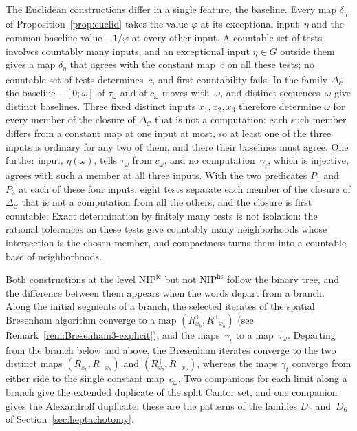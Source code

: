 \documentclass[psamsfonts]{amsart}
\theoremstyle{definition}
\theoremstyle{remark}
\newcommand{\NIP}{\text{NIP}}
\numberwithin{equation}{section}
\begin{document}
The Euclidean constructions differ in a single feature, the baseline.
Every map $\delta_\eta$ of Proposition~\ref{prop:euclid} takes the value $\varphi$ at its exceptional input~$\eta$ and the common baseline value $-1/\varphi$ at every other input.
A countable set of tests involves countably many inputs, and an exceptional input $\eta\in G$ outside them gives a map $\delta_\eta$ that agrees with the constant map~$c$ on all these tests; no countable set of tests determines~$c$, and first countability fails.
In the family $\Delta_{\mathcal{C}}$ the baseline $-[0;\omega]$ of $\tau_\omega$ and of $c_\omega$ moves with~$\omega$, and distinct sequences~$\omega$ give distinct baselines.
Three fixed distinct inputs $x_1,x_2,x_3$ therefore determine $\omega$ for every member of the closure of $\Delta_{\mathcal{C}}$ that is not a computation: each such member differs from a constant map at one input at most, so at least one of the three inputs is ordinary for any two of them, and there their baselines must agree.
One further input, $\eta(\omega)$, tells $\tau_\omega$ from $c_\omega$, and no computation~$\gamma_t$, which is injective, agrees with such a member at all three inputs.
With the two predicates $P_1$ and~$P_3$ at each of these four inputs, eight tests separate each member of the closure of $\Delta_{\mathcal{C}}$ that is not a computation from all the others, and the closure is first countable.
Exact determination by finitely many tests is not isolation: the rational tolerances on these tests give countably many neighborhoods whose intersection is the chosen member, and compactness turns them into a countable base of neighborhoods.

Both constructions at the level $\NIP^{\mathrm{fc}}$ but not $\NIP^{\mathrm{hs}}$ follow the binary tree, and the difference between them appears when the words depart from a branch.
Along the initial segments of a branch, the selected iterates of the spatial Bresenham algorithm converge to a map $(R_{x_b}^+,R_{-x_b}^+)$ (see Remark~\ref{rem:Bresenham3-explicit}), and the maps~$\gamma_t$ to a map~$\tau_\omega$.
Departing from the branch below and above, the Bresenham iterates converge to the two distinct maps $(R_{x_b}^-,R_{-x_b}^+)$ and $(R_{x_b}^+,R_{-x_b}^-)$, whereas the maps $\gamma_t$ converge from either side to the single constant map~$c_\omega$.
Two companions for each limit along a branch give the extended duplicate of the split Cantor set, and one companion gives the Alexandroff duplicate; these are the patterns of the families $D_7$ and~$D_6$ of Section~\ref{sec:heptachotomy}.
\end{document}
